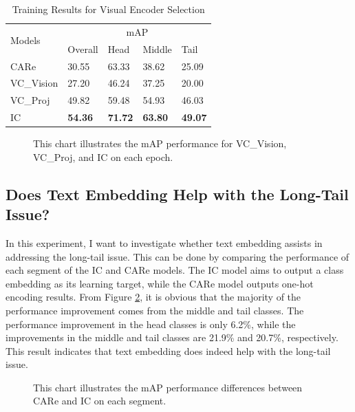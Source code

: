 \begin{table}[ht]
    \centering
    \caption{Training Results for Visual Encoder Selection}
    \label{tab:resultsbackbone}
    \begin{tabular}{lllll}
        \toprule
        \multirow{2}{*}{Models} & \multicolumn{4}{c}{mAP} \\
        \cmidrule{2-5} 
        {} & Overall & Head  & Middle & Tail \\
        \midrule
        CARe        & 30.55   & 63.33 & 38.62 & 25.09 \\
        VC\_Vision  & 27.20   & 46.24 & 37.25 & 20.00 \\
        VC\_Proj    & 49.82   & 59.48 & 54.93 & 46.03 \\
        IC          & \textbf{54.36} & \textbf{71.72} & \textbf{63.80} & \textbf{49.07} \\
        \bottomrule
    \end{tabular}
\end{table}


\begin{figure}[ht]
    \centering
    \resizebox{1.0\textwidth}{!}{}
    \caption[mAP performance for VC\_Vision, VC\_Proj, and IC on each epoch]{This chart illustrates the mAP performance for VC\_Vision, VC\_Proj, and IC on each epoch.}
    \label{fig:tp_backbone}
\end{figure}

\subsection{Does Text Embedding Help with the Long-Tail Issue?}
In this experiment, I want to investigate whether text embedding assists in addressing the long-tail issue. This can be done by comparing the performance of each segment of the IC and CARe models. The IC model aims to output a class embedding as its learning target, while the CARe model outputs one-hot encoding results. From Figure \ref{fig:tp_longtailcomp}, it is obvious that the majority of the performance improvement comes from the middle and tail classes. The performance improvement in the head classes is only 6.2\%, while the improvements in the middle and tail classes are 21.9\% and 20.7\%, respectively. This result indicates that text embedding does indeed help with the long-tail issue. 

\begin{figure}[ht]
    \centering
    \resizebox{1.0\textwidth}{!}{}
    \caption[mAP performance differences between CARe and IC on each segment]{This chart illustrates the mAP performance differences between CARe and IC on each segment.}
    \label{fig:tp_longtailcomp}
\end{figure}

